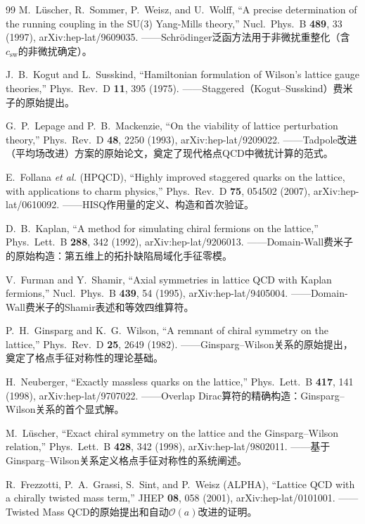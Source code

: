 \documentclass[12pt,a4paper]{ctexart}
\theoremstyle{definition}
\begin{document}
\begin{thebibliography}{99}
M.~L\"uscher, R.~Sommer, P.~Weisz, and U.~Wolff,
``A precise determination of the running coupling in the SU(3) Yang-Mills theory,''
Nucl.\ Phys.\ B \textbf{489}, 33 (1997), arXiv:hep-lat/9609035.
——Schr\"odinger泛函方法用于非微扰重整化（含$c_{\text{sw}}$的非微扰确定）。

J.~B.~Kogut and L.~Susskind,
``Hamiltonian formulation of Wilson's lattice gauge theories,''
Phys.\ Rev.\ D \textbf{11}, 395 (1975).
——Staggered（Kogut--Susskind）费米子的原始提出。

G.~P.~Lepage and P.~B.~Mackenzie,
``On the viability of lattice perturbation theory,''
Phys.\ Rev.\ D \textbf{48}, 2250 (1993), arXiv:hep-lat/9209022.
——Tadpole改进（平均场改进）方案的原始论文，奠定了现代格点QCD中微扰计算的范式。

E.~Follana \textit{et al.} (HPQCD),
``Highly improved staggered quarks on the lattice, with applications to charm physics,''
Phys.\ Rev.\ D \textbf{75}, 054502 (2007), arXiv:hep-lat/0610092.
——HISQ作用量的定义、构造和首次验证。

D.~B.~Kaplan,
``A method for simulating chiral fermions on the lattice,''
Phys.\ Lett.\ B \textbf{288}, 342 (1992), arXiv:hep-lat/9206013.
——Domain-Wall费米子的原始构造：第五维上的拓扑缺陷局域化手征零模。

V.~Furman and Y.~Shamir,
``Axial symmetries in lattice QCD with Kaplan fermions,''
Nucl.\ Phys.\ B \textbf{439}, 54 (1995), arXiv:hep-lat/9405004.
——Domain-Wall费米子的Shamir表述和等效四维算符。

P.~H.~Ginsparg and K.~G.~Wilson,
``A remnant of chiral symmetry on the lattice,''
Phys.\ Rev.\ D \textbf{25}, 2649 (1982).
——Ginsparg--Wilson关系的原始提出，奠定了格点手征对称性的理论基础。

H.~Neuberger,
``Exactly massless quarks on the lattice,''
Phys.\ Lett.\ B \textbf{417}, 141 (1998), arXiv:hep-lat/9707022.
——Overlap Dirac算符的精确构造：Ginsparg--Wilson关系的首个显式解。

M.~L\"uscher,
``Exact chiral symmetry on the lattice and the Ginsparg--Wilson relation,''
Phys.\ Lett.\ B \textbf{428}, 342 (1998), arXiv:hep-lat/9802011.
——基于Ginsparg--Wilson关系定义格点手征对称性的系统阐述。

R.~Frezzotti, P.~A.~Grassi, S.~Sint, and P.~Weisz (ALPHA),
``Lattice QCD with a chirally twisted mass term,''
JHEP \textbf{08}, 058 (2001), arXiv:hep-lat/0101001.
——Twisted Mass QCD的原始提出和自动$\mathcal{O}(a)$改进的证明。


\end{thebibliography}
\end{document}
